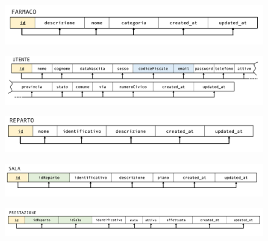 \documentclass[paper=a4, fontsize=11pt,x11names]{report}
\begin{document}
\begin{figure}
\begin{center}
\includegraphics[scale=0.35]{immagini_normalizzazione/farmaco}
\end{center}
\end{figure}

\begin{figure}[H]
\begin{center}
\includegraphics[scale=0.35]{immagini_normalizzazione/utente}
\end{center}
\end{figure}

\begin{figure}[H]
\begin{center}
\includegraphics[scale=0.35]{immagini_normalizzazione/reparto}
\end{center}
\end{figure}

\begin{figure}[H]
\begin{center}
\includegraphics[scale=0.35]{immagini_normalizzazione/sala}
\end{center}
\end{figure}

\begin{figure}[H]
\begin{center}
\includegraphics[scale=0.25]{immagini_normalizzazione/prestazione}
\end{center}
\end{figure}
\end{document}
